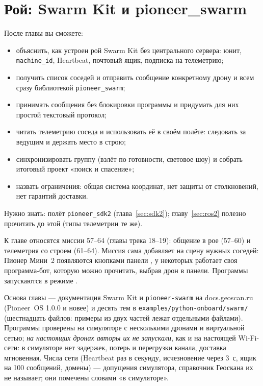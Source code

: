 \section{Рой: Swarm Kit и pioneer\_swarm}
\label{sec:swarm}

\begin{infobox}
После главы вы сможете:
\begin{itemize}
    \item объяснить, как устроен рой Swarm Kit без центрального сервера: юнит, \texttt{machine\_id}, Heartbeat, почтовый ящик, подписка на телеметрию;
    \item получить список соседей и отправить сообщение конкретному дрону и всем сразу библиотекой \texttt{pioneer\_swarm};
    \item принимать сообщения без блокировки программы и придумать для них простой текстовый протокол;
    \item читать телеметрию соседа и использовать её в своём полёте: следовать за ведущим и держать место в строю;
    \item синхронизировать группу (взлёт по готовности, световое шоу) и собрать итоговый проект «поиск и спасение»;
    \item назвать ограничения: общая система координат, нет защиты от столкновений, нет гарантий доставки.
\end{itemize}
Нужно знать: полёт \texttt{pioneer\_sdk2} (глава~\ref{sec:sdk2}); главу~\ref{sec:ros2} полезно прочитать до этой (типы телеметрии те же).
\end{infobox}

\begin{missionbox}
К главе относятся миссии 57--64 (главы трека  18--19): общение в рое (57--60) и телеметрия со строем (61--64). Миссия сама добавляет на сцену нужных соседей: Пионер Мини~2 появляются кнопками панели , у некоторых работает своя программа-бот, которую можно прочитать, выбрав дрон в панели. Программы запускаются в режиме .
\end{missionbox}

\begin{infobox}
Основа главы --- документация Swarm Kit и \texttt{pioneer-swarm} на docs.geoscan.ru (Pioneer~OS 1.0.0 и новее) и десять тем в \texttt{examples/python-onboard/swarm/} (шестнадцать файлов: примеры из двух частей лежат отдельными файлами). Программы проверены на симуляторе с несколькими дронами и виртуальной сетью; \emph{на настоящих дронах авторы их не запускали}, как и на настоящей Wi-Fi-сети: в симуляторе нет задержек, потерь и перегрузки канала, доставка мгновенная. Числа сети (Heartbeat раз в секунду, исчезновение через 3~с, ящик на 100 сообщений, домены) --- допущения симулятора, справочник Геоскана их не называет; они помечены словами «в симуляторе».
\end{infobox}

